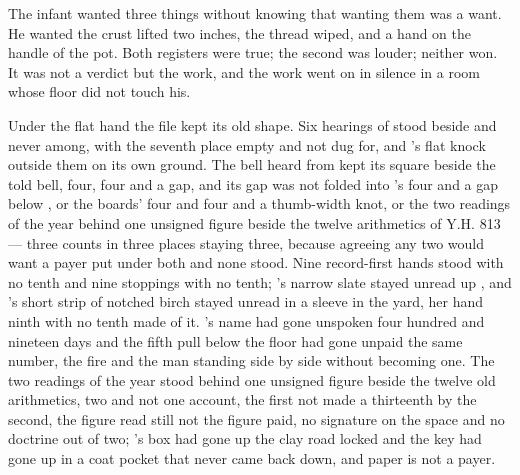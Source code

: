 The infant wanted three things without knowing that wanting them was a want. He wanted the crust lifted two inches, the thread wiped, and a hand on the handle of the pot. Both registers were true; the second was louder; neither won. It was not a verdict but the work, and the work went on in silence in a room whose floor did not touch his.

Under the flat hand the file kept its old shape. Six hearings of  stood beside and never among, with the seventh place empty and not dug for, and 's flat knock outside them on its own ground. The bell heard from  kept its square beside the told bell, four, four and a gap, and its gap was not folded into 's four and a gap below , or the boards' four and four and a thumb-width knot, or the two readings of the year behind one unsigned figure beside the twelve arithmetics of Y.H. 813 --- three counts in three places staying three, because agreeing any two would want a payer put under both and none stood. Nine record-first hands stood with no tenth and nine stoppings with no tenth; 's narrow slate stayed unread up , and 's short strip of notched birch stayed unread in a sleeve in the yard, her hand ninth with no tenth made of it. 's name had gone unspoken four hundred and nineteen days and the fifth pull below the floor had gone unpaid the same number, the fire and the man standing side by side without becoming one. The two readings of the year stood behind one unsigned figure beside the twelve old arithmetics, two and not one account, the first not made a thirteenth by the second, the figure read still not the figure paid, no signature on the space and no doctrine out of two; 's box had gone up the clay road locked and the key had gone up in a coat pocket that never came back down, and paper is not a payer.

